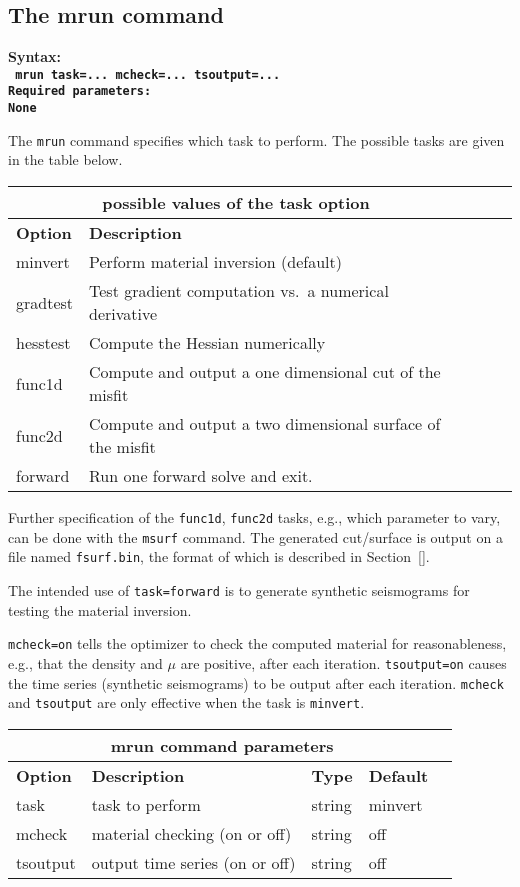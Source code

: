 \documentclass[12pt]{report}
\begin{document}
\subsection{The mrun command}\label{sec:mrun}
\begin{flushleft}\bf
Syntax:\\
\tt
mrun task=... mcheck=... tsoutput=... 
\\
\bf Required parameters:\\
\rm
None
\end{flushleft}
The \verb+mrun+ command specifies which task to perform. The possible tasks are
given in the table below. 
\begin{center}
\begin{tabular}{|l|p{8cm}|l|l|l|} \hline
\multicolumn{2}{|c|}{\bf possible values of the task option}\\ \hline
{\bf Option} & {\bf Description}           \\ \hline 
\hline
minvert     & Perform material inversion (default) \\ \hline
gradtest    & Test gradient computation vs.~a numerical derivative \\ \hline
hesstest    & Compute the Hessian numerically  \\ \hline
func1d      & Compute and output a one dimensional cut of the misfit \\ \hline
func2d      & Compute and output a two dimensional surface of the misfit \\ \hline
forward     & Run one forward solve and exit. \\ \hline
\end{tabular}
\end{center}
Further specification of the {\tt func1d}, {\tt func2d} tasks, e.g., which parameter to
vary, can be done with the \verb+msurf+ command. The generated cut/surface is output on
a file named {\tt fsurf.bin}, the format of which is described in Section~\ref{}.
\par
The intended use of \verb+task=forward+ is to
generate synthetic seismograms for testing the material inversion. \par
\verb+mcheck=on+ tells the optimizer to check the computed material for reasonableness, e.g.,
that the density and $\mu$ are positive, after each iteration. \verb+tsoutput=on+ causes
the time series (synthetic seismograms) to be output after each iteration.
\verb+mcheck+ and \verb+tsoutput+ are only effective when the task is \verb+minvert+.
\begin{center}
\begin{tabular}{|l|p{6cm}|l|l|l|} \hline
\multicolumn{4}{|c|}{\bf mrun command parameters}\\ \hline
{\bf Option} & {\bf Description}          & {\bf Type} & {\bf Default} \\ \hline 
\hline
task    & task to perform                 & string & minvert \\ \hline
mcheck  & material checking (on or off)   & string & off \\ \hline
tsoutput & output time series (on or off) & string & off \\ \hline
\end{tabular}
\end{center}
\end{document}
